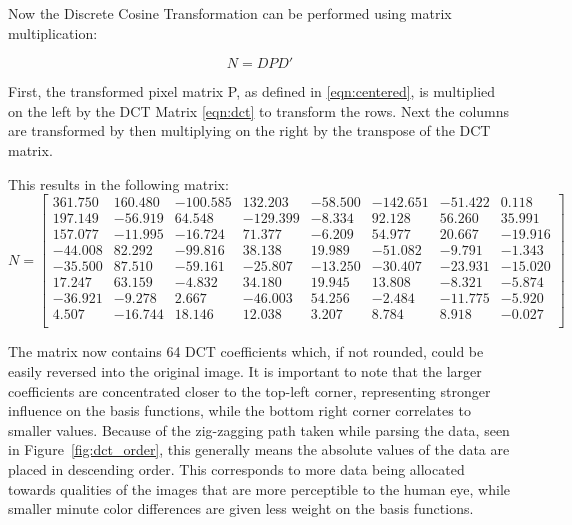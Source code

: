 \documentclass[11pt]{article}
\begin{document}
Now the Discrete Cosine Transformation can be performed using matrix multiplication:

\begin{equation}
  \label{eqn:transformation}
  N = DPD'
\end{equation}

First, the transformed pixel matrix P, as defined in \eqref{eqn:centered}, is multiplied on the left by the DCT Matrix \eqref{eqn:dct} to transform the rows.
Next the columns are transformed by then multiplying on the right by the transpose of the DCT matrix.

This results in the following matrix:
\begin{equation}
  \label{eqn:transformedMatrix}
  N = \begin{bmatrix}
    361.750 & 160.480 & -100.585 &  132.203 & -58.500 & -142.651 & -51.422 &   0.118 \\
    197.149 & -56.919 &   64.548 & -129.399 &  -8.334 &   92.128 &  56.260 &  35.991 \\
    157.077 & -11.995 &  -16.724 &   71.377 &  -6.209 &   54.977 &  20.667 & -19.916 \\
    -44.008 &  82.292 &  -99.816 &   38.138 &  19.989 &  -51.082 &  -9.791 &  -1.343 \\
    -35.500 &  87.510 &  -59.161 &  -25.807 & -13.250 &  -30.407 & -23.931 & -15.020 \\
     17.247 &  63.159 &   -4.832 &   34.180 &  19.945 &   13.808 &  -8.321 &  -5.874 \\
    -36.921 &  -9.278 &    2.667 &  -46.003 &  54.256 &   -2.484 & -11.775 &  -5.920 \\
      4.507 & -16.744 &   18.146 &   12.038 &   3.207 &    8.784 &   8.918 &  -0.027 \\
  \end{bmatrix}
\end{equation}

The matrix now contains 64 DCT coefficients which, if not rounded, could be easily reversed into the original image.
It is important to note that the larger coefficients are concentrated closer to the top-left corner, representing stronger influence on the basis functions, while the bottom right corner correlates to smaller values.
Because of the zig-zagging path taken while parsing the data, seen in Figure~\ref{fig:dct_order}, this generally means the absolute values of the data are placed in descending order.
This corresponds to more data being allocated towards qualities of the images that are more perceptible to the human eye, while smaller minute color differences are given less weight on the basis functions.
\end{document}
